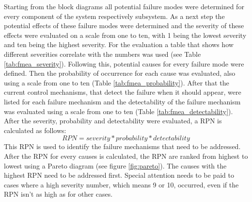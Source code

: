 \documentclass[ExampleMasters.tex]{subfiles}
\begin{document}
Starting from the block diagrams all potential failure modes were determined for every component of the system respectively subsystem. As a next step the potential effects of these failure modes were determined and the severity of these effects were evaluated on a scale from one to ten,  with 1 being the lowest severity and ten being the highest severity. For the evaluation a table that shows how different severities correlate with the numbers was used (see Table \ref{tab:fmea_severity}). 
Following this, potential causes for every failure mode were defined. Then the probability of occurrence for each cause was evaluated, also using a scale from one to ten (Table \ref{tab:fmea_probability}).
After that the current control mechanisms, that detect the failure when it should appear, were listed for each failure mechanism and the detectability of the failure mechanism was evaluated using a scale from one to ten (Table \ref{tab:fmea_detectability}).
After the severity, probability and detectability were evaluated, a \gls{RPN} is calculated as follows: 
\begin{equation*}
RPN=severity*probability*detectability
\end{equation*}      
This \gls{RPN} is used to identify the failure mechanisms that need to be addressed. After the \gls{RPN} for every causes is calculated, the \gls{RPN} are ranked from highest to lowest using a Pareto diagram (see figure \ref{fig:pareto}). The causes with the highest \gls{RPN} need to be addressed first. Special attention needs to be paid to cases where a high severity number, which means 9 or 10, occurred, even if the \gls{RPN} isn't as high as for other cases. 
		
\end{document}

